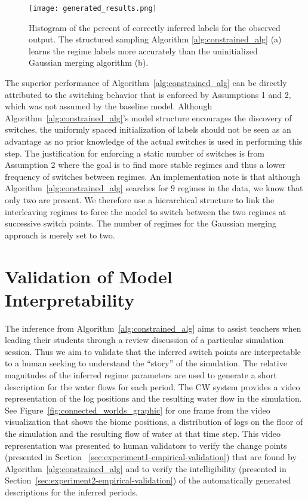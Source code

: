\begin{figure}
\centering
\texttt{[image: generated\_results.png]}
\caption{Histogram of the percent of correctly inferred labels for the observed output. The structured sampling Algorithm \ref{alg:constrained_alg} (a) learns the regime labels more accurately than the uninitialized Gaussian merging algorithm (b).}
\label{fig:result_generated_histograms}
\end{figure}

The superior performance of Algorithm~\ref{alg:constrained_alg} can be directly attributed to the switching behavior that is enforced by Assumptions 1 and 2, which was not assumed by the baseline model. Although Algorithm~\ref{alg:constrained_alg}'s model structure encourages the discovery of switches, the uniformly spaced initialization of labels should not be seen as an advantage as no prior knowledge of the actual switches is used in performing this step. The justification for enforcing a static number of switches is from Assumption 2 where the goal is to find more stable regimes and thus a lower frequency of switches between regimes. An implementation note is that although Algorithm~\ref{alg:constrained_alg} searches for $9$ regimes in the data, we know that only two are present. We therefore use a hierarchical structure to link the interleaving regimes to force the model to switch between the two regimes at successive switch points. The number of regimes for the Gaussian merging approach is merely set to two.

\section{Validation of Model Interpretability}

The inference from Algorithm~\ref{alg:constrained_alg} aims to assist teachers when leading their students through a review discussion of a particular simulation session. Thus we aim to validate that the inferred switch points are interpretable to a human seeking to understand the ``story'' of the simulation. The relative magnitudes of the inferred regime parameters are used to generate a short description for the water flows for each period. The CW system provides a video representation of the log positions and the resulting water flow in the simulation. See Figure~\ref{fig:connected_worlds_graphic} for one frame from the video visualization that shows the biome positions, a distribution of logs on the floor of the simulation and the resulting flow of water at that time step. This video representation was presented to human validators to verify the change points (presented in Section~ \ref{sec:experiment1-empirical-validation}) that are found by Algorithm~\ref{alg:constrained_alg} and to verify the intelligibility (presented in Section~\ref{sec:experiment2-empirical-validation}) of the automatically generated descriptions for the inferred periods.

